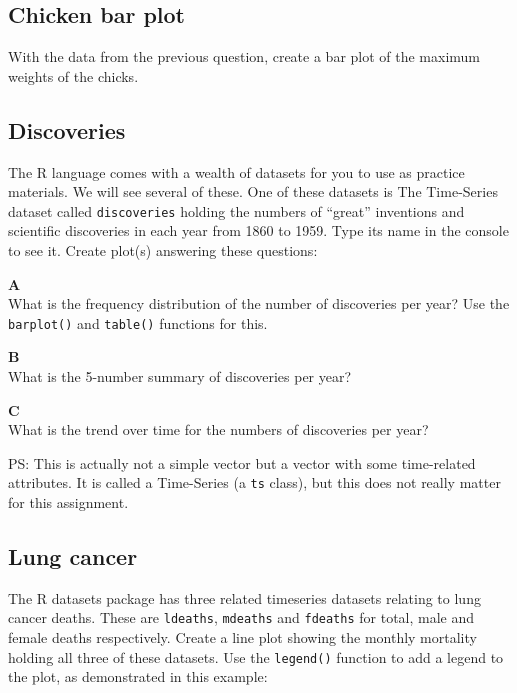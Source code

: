 \documentclass[]{book}
\begin{document}
\hypertarget{chicken-bar-plot}{%
\subsection{Chicken bar plot}\label{chicken-bar-plot}}

With the data from the previous question, create a bar plot of the maximum weights of the chicks.

\hypertarget{discoveries}{%
\subsection{Discoveries}\label{discoveries}}

The R language comes with a wealth of datasets for you to use as practice materials. We will see several of these. One of these datasets is The Time-Series dataset called \texttt{discoveries} holding the numbers of ``great'' inventions and scientific discoveries in each year from 1860 to 1959. Type its name in the console to see it. Create plot(s) answering these questions:

\textbf{A}\\
What is the frequency distribution of the number of discoveries per year? Use the \texttt{barplot()} and \texttt{table()} functions for this.

\textbf{B}\\
What is the 5-number summary of discoveries per year?

\textbf{C}\\
What is the trend over time for the numbers of discoveries per year?

PS: This is actually not a simple vector but a vector with some time-related attributes. It is called a Time-Series (a \texttt{ts} class), but this does not really matter for this assignment.

\hypertarget{lung-cancer}{%
\subsection{Lung cancer}\label{lung-cancer}}

The R datasets package has three related timeseries datasets relating to lung cancer deaths. These are \texttt{ldeaths}, \texttt{mdeaths} and \texttt{fdeaths} for total, male and female deaths respectively. Create a line plot showing the monthly mortality holding all three of these datasets. Use the \texttt{legend()} function to add a legend to the plot, as demonstrated in this example:
\end{document}
